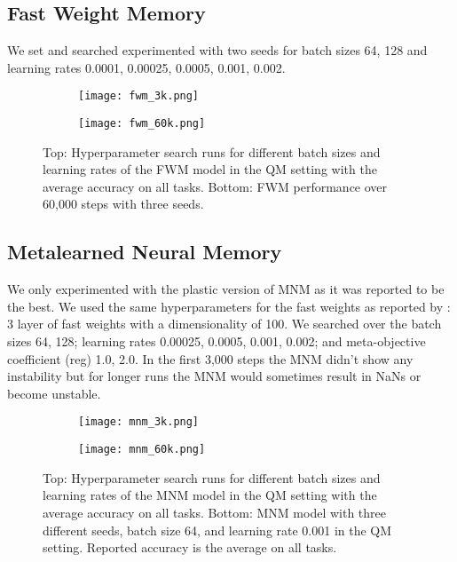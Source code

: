 \documentclass{article} \usepackage{iclr2021_conference,times}
\begin{document}
\subsection{Fast Weight Memory}
We set  and searched experimented with two seeds for batch sizes 64, 128 and learning rates 0.0001, 0.00025, 0.0005, 0.001, 0.002.
\begin{figure}[H]
  \centering
\begin{subfigure}[b]{0.8\linewidth}
    \texttt{[image: fwm\_3k.png]}
  \end{subfigure}
  \begin{subfigure}[b]{0.8\linewidth}
    \texttt{[image: fwm\_60k.png]}
  \end{subfigure}
  \caption{Top: Hyperparameter search runs for different batch sizes and learning rates of the FWM model in the QM setting with the average accuracy on all tasks. Bottom: FWM performance over 60,000 steps with three seeds.}
  \label{appendix:fig:fwm}
\end{figure}

\subsection{Metalearned Neural Memory}
We only experimented with the plastic version of MNM as it was reported to be the best. We used the same hyperparameters for the fast weights as reported by \citet{munkhdalai2019metalearned}: 3 layer of fast weights with a dimensionality of 100. We searched over the batch sizes 64, 128; learning rates 0.00025, 0.0005, 0.001, 0.002; and meta-objective coefficient (reg) 1.0, 2.0. In the first 3,000 steps the MNM didn't show any instability but for longer runs the MNM would sometimes result in NaNs or become unstable.
\begin{figure}[H]
  \centering
\begin{subfigure}[b]{\linewidth}
    \texttt{[image: mnm\_3k.png]}
  \end{subfigure}
  \begin{subfigure}[b]{\linewidth}
    \texttt{[image: mnm\_60k.png]}
  \end{subfigure}
  \caption{Top: Hyperparameter search runs for different batch sizes and learning rates of the MNM model in the QM setting with the average accuracy on all tasks. Bottom: MNM model with three different seeds, batch size 64, and learning rate 0.001 in the QM setting. Reported accuracy is the average on all tasks.}
  \label{appendix:fig:mnm}
\end{figure}
\end{document}
